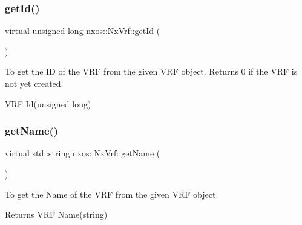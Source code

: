 \subsubsection{\texorpdfstring{get\+Id()}{getId()}}
{\footnotesize\ttfamily virtual unsigned long nxos\+::\+Nx\+Vrf\+::get\+Id (\begin{DoxyParamCaption}{ }\end{DoxyParamCaption})\hspace{0.3cm}{\ttfamily [pure virtual]}}

To get the ID of the V\+RF from the given V\+RF object. Returns 0 if the V\+RF is not yet created.

V\+RF Id(unsigned long)


 \mbox{\label{classnxos_1_1_nx_vrf_a276a8d8170f372089a5653bdd7febfde}} 
\subsubsection{\texorpdfstring{get\+Name()}{getName()}}
{\footnotesize\ttfamily virtual std\+::string nxos\+::\+Nx\+Vrf\+::get\+Name (\begin{DoxyParamCaption}{ }\end{DoxyParamCaption})\hspace{0.3cm}{\ttfamily [pure virtual]}}

To get the Name of the V\+RF from the given V\+RF object.

\begin{DoxyReturn}{Returns}
V\+RF Name(string)
\end{DoxyReturn}

